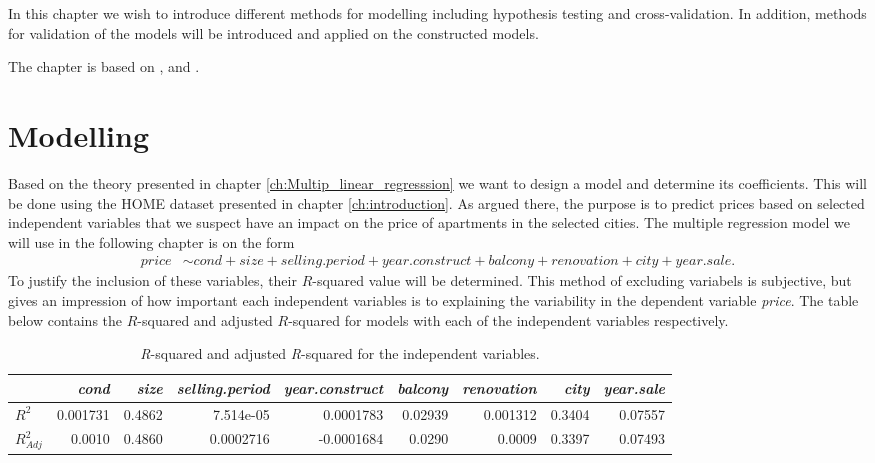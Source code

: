 In this chapter we wish to introduce different methods for modelling including hypothesis testing and cross-validation.
In addition, methods for validation of the models will be introduced and applied on the constructed models.

The chapter is based on \cite{Allison2012}, \cite{MadsenThyregod2011} and \cite{Wooldridge2012}.

\section{Modelling} \label{sec:modelling}
Based on the theory presented in chapter \ref{ch:Multip_linear_regresssion} we want to design a model and determine its coefficients. 
This will be done using the HOME dataset presented in chapter \ref{ch:introduction}. 
As argued there, the purpose is to predict prices based on selected independent variables that we suspect have an impact on the price of apartments in the selected cities.
The multiple regression model we will use in the following chapter is on the form
\begin{align*}
    \textit{price} &\sim \textit{cond} + \textit{size} + \textit{selling.period} + \textit{year.construct} + \textit{balcony} + \textit{renovation} + \textit{city} + \textit{year.sale}.
\end{align*}
To justify the inclusion of these variables, their $R$-squared value will be determined. 
This method of excluding variabels is subjective, but gives an impression of how important each independent variables is to explaining the variability in the dependent variable \textit{price}. 
The table below contains the $R$-squared and adjusted $R$-squared for models with each of the independent variables respectively.
\begin{table}[H]
\centering
\footnotesize
\begin{tabular}{lrrrrrrrr}
\toprule
\textbf{}          & \textit{cond} & \textit{size} & \textit{selling.period} & \textit{year.construct} & \textit{balcony} & \textit{renovation} & \textit{city} & \textit{year.sale} \\
\midrule
$R^2$ & 0.001731                & 0.4862              & 7.514e-05           & 0.0001783                  & 0.02939        & 0.001312              & 0.3404   & 0.07557     \\
$R^2_{Adj}$ & 0.0010                & 0.4860              & 0.0002716           & -0.0001684                  & 0.0290        & 0.0009              & 0.3397  & 0.07493 \\
\bottomrule
\end{tabular}
\caption{\textit{R}-squared and adjusted \textit{R}-squared for the independent variables.}
\label{tab:r-squared}
\end{table}


